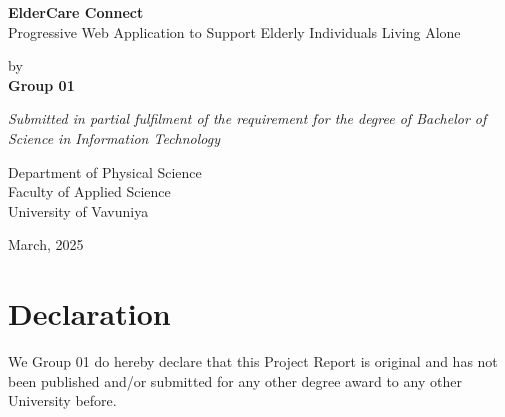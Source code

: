 \documentclass[12pt, a4paper]{report}
\begin{document}
\renewcommand\bibname{References} %


\begin{titlepage}

\begin{center}

\Large \textbf {ElderCare Connect}\\
Progressive Web Application to Support Elderly Individuals Living Alone\\%

\vspace{1in}%


\normalsize by \\%
\vspace{1em}
\textup{\large {\bf Group 01 }\\}
 \vspace{1in}%


 \large \emph{Submitted in partial fulfilment of the requirement
for the degree of Bachelor of Science in Information Technology}
\vspace{2.5in}




\vspace{1em}
Department of Physical Science\\
Faculty of Applied Science\\
University of Vavuniya\\




\vfill

March, 2025

\end{center}

\end{titlepage}




\cleardoublepage
{}
\chapter*{Declaration}
We Group 01 do hereby declare that this Project Report is original and has not been published and/or submitted for any other degree award to any other University before.
\end{document}
